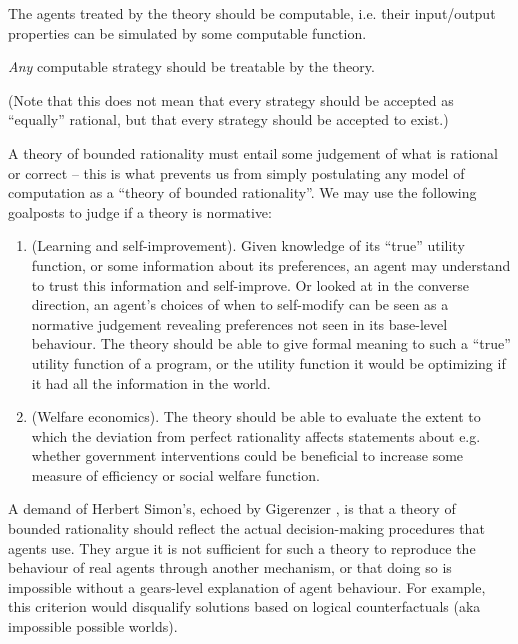 \begin{desideratum}[Computability]
    \label{des:computable}
    The agents treated by the theory should be computable, i.e. their input/output properties can be simulated by some computable function. 
\end{desideratum}

\begin{desideratum}[Descriptivity]
    \label{des:descriptive} 
    \emph{Any} computable strategy should be treatable by the theory.

    (Note that this does not mean that every strategy should be accepted as ``equally'' rational, but that every strategy should be accepted to exist.)
\end{desideratum}

\begin{desideratum}[Normativity]
    \label{des:normative} 
    A theory of bounded rationality must entail some judgement of what is rational or correct -- this is what prevents us from simply postulating any model of computation as a ``theory of bounded rationality''. We may use the following goalposts to judge if a theory is normative: 
    \begin{enumerate}[label = \textbf{\alph*}]
        \item (Learning and self-improvement). Given knowledge of its ``true'' utility function, or some information about its preferences, an agent may understand to trust this information and self-improve. Or looked at in the converse direction, an agent's choices of when to self-modify can be seen as a normative judgement revealing preferences not seen in its base-level behaviour. The theory should be able to give formal meaning to such a ``true'' utility function of a program, or the utility function it would be optimizing if it had all the information in the world.
        \item (Welfare economics). The theory should be able to evaluate the extent to which the deviation from perfect rationality affects statements about e.g. whether government interventions could be beneficial to increase some measure of efficiency or social welfare function.
    \end{enumerate}
\end{desideratum}

\begin{desideratum}
    \label{des:heuristic}
    A demand of Herbert Simon's, echoed by Gigerenzer \cite{oldreview_gigerenzer}, is that a theory of bounded rationality should reflect the actual decision-making procedures that agents use. They argue it is not sufficient for such a theory to reproduce the behaviour of real agents through another mechanism, or that doing so is impossible without a gears-level explanation of agent behaviour. For example, this criterion would disqualify solutions based on logical counterfactuals (aka impossible possible worlds). 
\end{desideratum}

